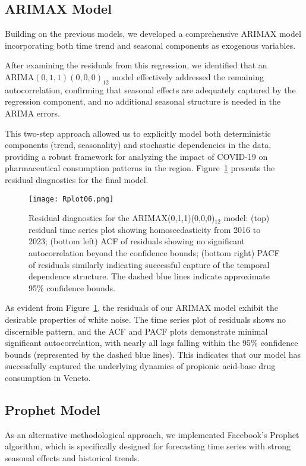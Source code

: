 \documentclass[10pt]{article}
\begin{document}
\subsection{ARIMAX Model}
Building on the previous models, we developed a comprehensive ARIMAX model incorporating both time trend and seasonal components as exogenous variables.

After examining the residuals from this regression, we identified that an $\text{ARIMA}(0,1,1)(0,0,0)_{12}$ model effectively addressed the remaining autocorrelation, confirming that seasonal effects are adequately captured by the regression component, and no additional seasonal structure is needed in the ARIMA errors.

This two-step approach allowed us to explicitly model both deterministic components (trend, seasonality) and stochastic dependencies in the data, providing a robust framework for analyzing the impact of COVID-19 on pharmaceutical consumption patterns in the region. Figure~\ref{fig:arimax} presents the residual diagnostics for the final model.

\begin{figure}[ht]
\centering
\texttt{[image: Rplot06.png]}
\caption{Residual diagnostics for the ARIMAX(0,1,1)(0,0,0)$_{12}$ model: (top) residual time series plot showing homoscedasticity from 2016 to 2023; (bottom left) ACF of residuals showing no significant autocorrelation beyond the confidence bounds; (bottom right) PACF of residuals similarly indicating successful capture of the temporal dependence structure. The dashed blue lines indicate approximate 95\% confidence bounds.}
\label{fig:arimax}
\end{figure}

As evident from Figure~\ref{fig:arimax}, the residuals of our ARIMAX model exhibit the desirable properties of white noise. The time series plot of residuals shows no discernible pattern, and the ACF and PACF plots demonstrate minimal significant autocorrelation, with nearly all lags falling within the 95\% confidence bounds (represented by the dashed blue lines). This indicates that our model has successfully captured the underlying dynamics of propionic acid-base drug consumption in Veneto.

\subsection{Prophet Model}
As an alternative methodological approach, we implemented Facebook's Prophet algorithm, which is specifically designed for forecasting time series with strong seasonal effects and historical trends. 
\end{document}
